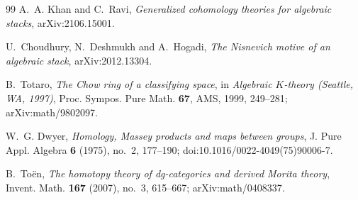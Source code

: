 \documentclass[11pt]{article}
\theoremstyle{remark}
\begin{document}
\begin{thebibliography}{99}
A.~A. Khan and C.~Ravi,
\emph{Generalized cohomology theories for algebraic stacks},
arXiv:2106.15001.

U.~Choudhury, N.~Deshmukh and A.~Hogadi,
\emph{The Nisnevich motive of an algebraic stack},
arXiv:2012.13304.

B.~Totaro,
\emph{The Chow ring of a classifying space},
in \emph{Algebraic $K$-theory (Seattle, WA, 1997)},
Proc. Sympos. Pure Math. \textbf{67}, AMS, 1999, 249--281;
arXiv:math/9802097.

W.~G. Dwyer,
\emph{Homology, Massey products and maps between groups},
J. Pure Appl. Algebra \textbf{6} (1975), no.~2, 177--190;
doi:10.1016/0022-4049(75)90006-7.

B.~To\"en,
\emph{The homotopy theory of dg-categories and derived Morita theory},
Invent. Math. \textbf{167} (2007), no.~3, 615--667;
arXiv:math/0408337.

\end{thebibliography}
\end{document}
